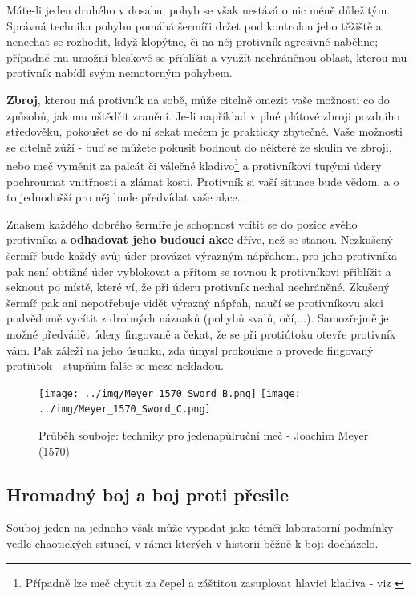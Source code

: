 Máte-li jeden druhého v dosahu, pohyb se však nestává o nic méně důležitým. Správná technika pohybu pomáhá šermíři držet pod kontrolou jeho těžiště a nenechat se rozhodit, když klopýtne, či na něj protivník agresivně naběhne; případně mu umožní bleskově se přiblížit a využít nechráněnou oblast, kterou mu protivník nabídl svým nemotorným pohybem. 

\textbf{Zbroj}, kterou má protivník na sobě, může citelně omezit vaše možnosti co do způsobů, jak mu uštědřit zranění. Je-li například v plné plátové zbroji pozdního středověku, pokoušet se do ní sekat mečem je prakticky zbytečné. Vaše možnosti se citelně zúží - buď se můžete pokusit bodnout do některé ze skulin ve zbroji, nebo meč vyměnit za palcát či válečné kladivo\footnote{Případně lze meč chytit za čepel a záštitou zasuplovat hlavici kladiva - viz \cite{FightingWithTheGermanLongsword}} a protivníkovi tupými údery pochroumat vnitřnosti a zlámat kosti. Protivník si vaší situace bude vědom, a o to jednodušší pro něj bude předvídat vaše akce.

Znakem každého dobrého šermíře je schopnost vcítit se do pozice svého protivníka a \textbf{odhadovat jeho budoucí akce} dříve, než se stanou. Nezkušený šermíř bude každý svůj úder provázet výrazným nápřahem, pro jeho protivníka pak není obtížné úder vyblokovat a přitom se rovnou k protivníkovi přiblížit a seknout po místě, které ví, že při úderu protivník nechal nechráněné. Zkušený šermíř pak ani nepotřebuje vidět výrazný nápřah, naučí se protivníkovu akci podvědomě vycítit z drobných náznaků (pohybů svalů, očí,...). Samozřejmě je možné předvádět údery fingovaně a čekat, že se při protiútoku otevře protivník vám. Pak záleží na jeho úsudku, zda úmysl prokoukne a provede fingovaný protiútok - stupňům falše se meze nekladou. 


\begin{figure}[ht]\centering
    \center
    \texttt{[image: ../img/Meyer\_1570\_Sword\_B.png]}
    \texttt{[image: ../img/Meyer\_1570\_Sword\_C.png]}
    \caption{Průběh souboje: techniky pro jedenapůlruční meč - Joachim Meyer (1570) \cite{KunstDesFechtens}}
    \label{obr01:KunstDesFechtens}
    
\end{figure}

\subsection{Hromadný boj a boj proti přesile} \label{organizedFightingIrlSubsection}
Souboj jeden na jednoho však může vypadat jako téměř laboratorní podmínky vedle chaotických situací, v rámci kterých v historii běžně k boji docházelo.   

